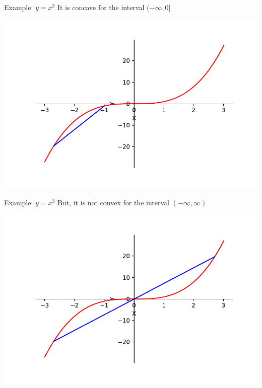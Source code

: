\documentclass{beamer}
\begin{document}
	\begin{frame}{Example: $y = x^3$}
	It is concave for the interval $(-\infty, 0]$
	\begin{center}
	\includegraphics[scale=0.5]{y-x3_neg}
	\end{center}
	\end{frame}

	\begin{frame}{Example: $y = x^3$}
	But, it is not convex for the interval $(-\infty, \infty)$
	\begin{center}
	\includegraphics[scale=0.5]{y-x3}
	\end{center}
	\end{frame}
\end{document}
